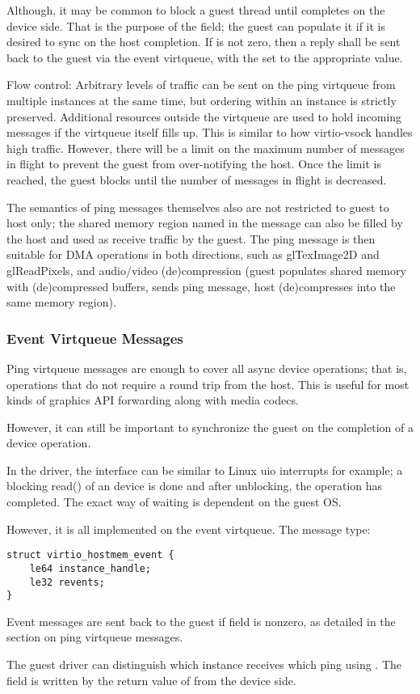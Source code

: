 Although, it may be common to block a guest thread until 
completes on the device side.
That is the purpose of the  field; the guest can populate it
if it is desired to sync on the host completion.
If  is not zero, then a reply shall be sent
back to the guest via the event virtqueue,
with the  set to the appropriate value.

Flow control: Arbitrary levels of traffic can be sent
on the ping virtqueue from multiple instances at the same time,
but ordering within an instance is strictly preserved.
Additional resources outside the virtqueue are used to hold incoming messages
if the virtqueue itself fills up.
This is similar to how virtio-vsock handles high traffic.
However, there will be a limit on the maximum number of messages in flight
to prevent the guest from over-notifying the host.
Once the limit is reached, the guest blocks until the number of messages in flight
is decreased.

The semantics of ping messages themselves also are not restricted to guest to host only;
the shared memory region named in the message can also be filled by the host
and used as receive traffic by the guest.
The ping message is then suitable for DMA operations in both directions,
such as glTexImage2D and glReadPixels,
and audio/video (de)compression (guest populates shared memory with (de)compressed buffers,
sends ping message, host (de)compresses into the same memory region).

\subsubsection{Event Virtqueue Messages}\label{sec:Device Types / Host Memory Device / Device Operation / Event Virtqueue Messages}

Ping virtqueue messages are enough to cover all async device operations;
that is, operations that do not require a round trip from the host.
This is useful for most kinds of graphics API forwarding along
with media codecs.

However, it can still be important to synchronize the guest on the completion
of a device operation.

In the driver, the interface can be similar to Linux uio interrupts for example;
a blocking read() of an device is done and after unblocking,
the operation has completed.
The exact way of waiting is dependent on the guest OS.

However, it is all implemented on the event virtqueue. The message type:

\begin{lstlisting}
struct virtio_hostmem_event {
    le64 instance_handle;
    le32 revents;
}
\end{lstlisting}

Event messages are sent back to the guest if  field is nonzero,
as detailed in the section on ping virtqueue messages.

The guest driver can distinguish which instance receives which ping using
.
The field  is written by the return value of
 from the device side.

